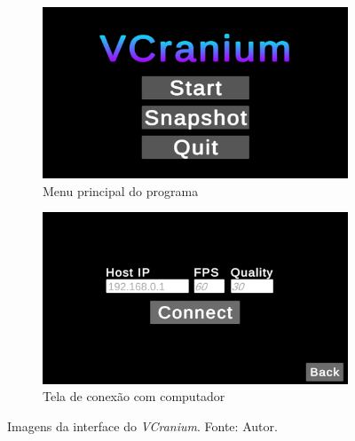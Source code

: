 \begin{figure}[ht]
    \centering
        \begin{subfigure}{.45\textwidth}
            \centering
            \includegraphics[width=.95\linewidth]{figuras/vcranium_main.png}
            \caption{Menu principal do programa}
            \label{fig:vcranium-connect}
        \end{subfigure}
        \begin{subfigure}{.45\textwidth}
            \centering
            \includegraphics[width=.95\linewidth]{figuras/vcranium_connect.png}
            \caption{Tela de conexão com computador}
            \label{fig:vcranium2-connect}
        \end{subfigure}
        \caption{Imagens da interface do \textit{VCranium}. Fonte: Autor.}
        \label{fig:ui1}
\end{figure}




